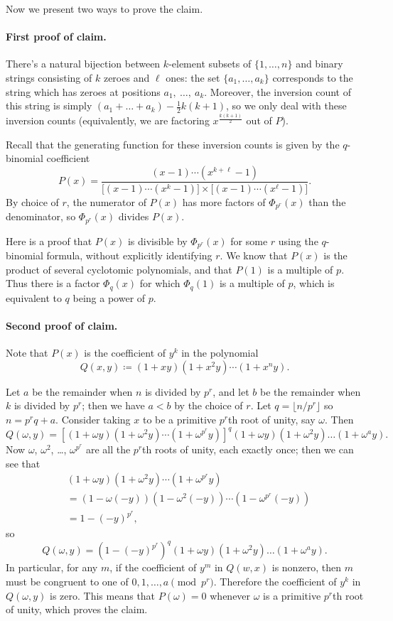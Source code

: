 Now we present two ways to prove the claim.

\paragraph{First proof of claim.}
There's a natural bijection between $k$-element subsets of $\{1, \dots, n\}$
and binary strings consisting of $k$ zeroes and $\ell$ ones:
the set $\{a_1, \dots, a_k\}$ corresponds to the string
which has zeroes at positions $a_1,\ \dots,\ a_k$.
Moreover, the inversion count of this string is simply $(a_1 + \dots + a_k) - \tfrac12k(k+1)$,
so we only deal with these inversion counts (equivalently, we are factoring
$x^{\frac{k(k+1)}{2}}$ out of $P$).

Recall that the generating function for these inversion counts is given by the
$q$-binomial coefficient
\[
	P(x) = \frac{(x-1) \cdots (x^{k+\ell}-1)}
	{\big[(x-1)\cdots(x^k-1)\big] \times \big[(x-1)\cdots(x^\ell-1)\big]}.
\]
By choice of $r$, the numerator of $P(x)$ has more factors of $\Phi_{p^r}(x)$
than the denominator, so $\Phi_{p^r}(x)$ divides $P(x)$.

\begin{remark*}
  Here is a proof that $P(x)$ is divisible by $\Phi_{p^r}(x)$ for some $r$ using
  the $q$-binomial formula, without explicitly identifying $r$. We know that
  $P(x)$ is the product of several cyclotomic polynomials, and that $P(1)$ is a
  multiple of $p$. Thus there is a factor $\Phi_q(x)$ for which $\Phi_q(1)$ is a
  multiple of $p$, which is equivalent to $q$ being a power of $p$.
\end{remark*}

\paragraph{Second proof of claim.}
Note that $P(x)$ is the coefficient of $y^k$ in the polynomial
\[ Q(x, y) \coloneqq (1+xy)(1+x^2y)\dotsm(1+x^ny). \]

Let $a$ be the remainder when $n$ is divided by $p^r$, and let $b$ be the
remainder when $k$ is divided by $p^r$; then we have $a<b$ by the choice of $r$.
Let $q = \lfloor n/p^r\rfloor$ so $n=p^rq+a$.
Consider taking $x$ to be a primitive $p^r$th root of unity, say $\omega$. Then
\[
  Q(\omega, y) = \left[(1+\omega y)(1+\omega^2y)\cdots (1+\omega^{p^r}y)\right]^q
  (1+\omega y)(1+\omega^2y)\dots (1+\omega^a y).
\]
Now $\omega$, $\omega^2$, \dots, $\omega^{p^r}$ are all the $p^r$th roots of unity,
each exactly once; then we can see that
\begin{align*}
  & (1+\omega y)(1+\omega^2y)\cdots (1+\omega^{p^r}y) \\
  &= (1-\omega(-y))(1-\omega^2(-y))\cdots (1-\omega^{p^r}(-y)) \\
  &= 1-(-y)^{p^r},
\end{align*}
so
\[ Q(\omega,y) = (1-(-y)^{p^r})^q (1+\omega y)(1+\omega^2y)\dots (1+\omega^ay). \]
In particular, for any $m$, if the coefficient of $y^m$ in $Q(w,x)$ is nonzero,
then $m$ must be congruent to one of $0,1, \dots, a \pmod{p^r}$.
Therefore the coefficient of $y^k$ in $Q(\omega, y)$ is zero.
This means that $P(\omega)=0$ whenever $\omega$ is a primitive $p^r$th root
of unity, which proves the claim.
